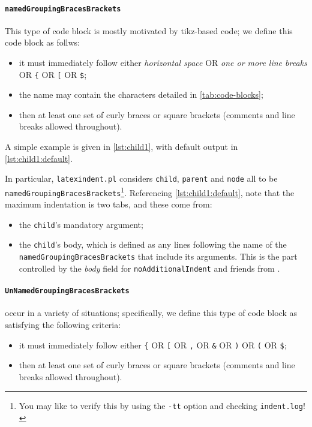 	\paragraph{\texttt{namedGroupingBracesBrackets}}
		This type of code block is mostly motivated by tikz-based code; we define this code block as follws:
		\begin{itemize}
			\item it must immediately follow either \emph{horizontal space} OR \emph{one or more line breaks} OR \lstinline!{! OR \lstinline![!
			      OR \lstinline!$!;
			\item the name may contain the characters detailed in \vref{tab:code-blocks};
			\item then at least one set of curly braces or square brackets (comments and line breaks allowed throughout).
		\end{itemize}
		A simple example is given in \cref{lst:child1}, with default output in \cref{lst:child1:default}.

		\begin{minipage}{.45\textwidth}
		\end{minipage}%
		\hfill
		\begin{minipage}{.5\textwidth}
		\end{minipage}%

		In particular, \texttt{latexindent.pl} considers \texttt{child}, \texttt{parent} and \texttt{node} all to be \texttt{namedGroupingBracesBrackets}\footnote{
			You may like to verify this by using the \texttt{-tt} option and checking \texttt{indent.log}! }. 
            Referencing \cref{lst:child1:default},
		note that the maximum indentation is two tabs, and these come from:
		\begin{itemize}
			\item the \lstinline!child!'s mandatory argument;
			\item the \lstinline!child!'s body, which is defined as any lines following the name of the \texttt{namedGroupingBracesBrackets}
			      that include its arguments. This is the part controlled by the \emph{body} field for \texttt{noAdditionalIndent}
			      and friends from .
		\end{itemize}

	\paragraph{\texttt{UnNamedGroupingBracesBrackets}} occur in a variety of situations; specifically, we define
		this type of code block as satisfying the following criteria:
		\begin{itemize}
			\item it must immediately follow either \lstinline!{! OR \lstinline![! OR \lstinline!,! OR \lstinline!&! OR \lstinline!)! OR \lstinline!(!
			      OR \lstinline!$!;
			\item then at least one set of curly braces or square brackets (comments and line breaks allowed throughout).
		\end{itemize}

